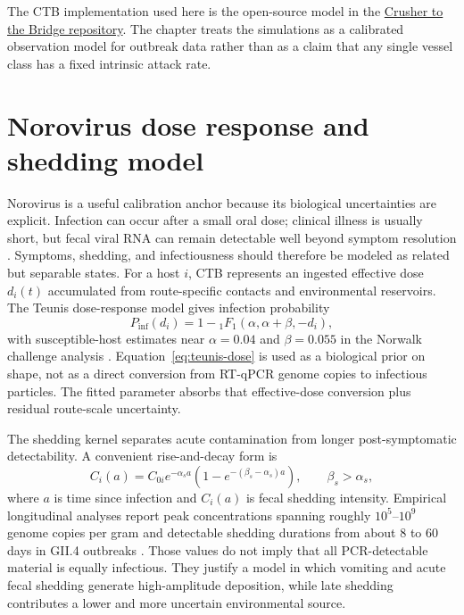 The CTB implementation used here is the open-source model in the
\href{https://github.com/bckirkup/Crusher_to_the_Bridge}{Crusher to the Bridge repository}. The chapter treats
the simulations as a calibrated observation model for outbreak data rather than as a claim that any single vessel
class has a fixed intrinsic attack rate.

\section{Norovirus dose response and shedding model}
Norovirus is a useful calibration anchor because its biological uncertainties are explicit. Infection can occur
after a small oral dose; clinical illness is usually short, but fecal viral RNA can remain detectable well beyond
symptom resolution \citep{Karst2010Pathogenesis,Teunis2014}. Symptoms, shedding, and infectiousness should
therefore be modeled as related but separable states. For a host \(i\), CTB represents an ingested effective dose
\(d_i(t)\) accumulated from route-specific contacts and environmental reservoirs. The Teunis dose-response model
gives infection probability
\begin{equation}
  P_{\mathrm{inf}}(d_i)=1-{}_1F_1\left(\alpha,\alpha+\beta,-d_i\right),
  \label{eq:teunis-dose}
\end{equation}
with susceptible-host estimates near \(\alpha=0.04\) and \(\beta=0.055\) in the Norwalk challenge analysis
\citep{Teunis2008DoseResponse}. Equation~\ref{eq:teunis-dose} is used as a biological prior on shape, not as a
direct conversion from RT-qPCR genome copies to infectious particles. The fitted \doseadj{} parameter absorbs that
effective-dose conversion plus residual route-scale uncertainty.

The shedding kernel separates acute contamination from longer post-symptomatic detectability. A convenient
rise-and-decay form is
\begin{equation}
  C_i(a)=C_{0i}e^{-\alpha_s a}\left(1-e^{-(\beta_s-\alpha_s)a}\right),
  \qquad \beta_s>\alpha_s,
  \label{eq:shedding-kernel}
\end{equation}
where \(a\) is time since infection and \(C_i(a)\) is fecal shedding intensity. Empirical longitudinal analyses
report peak concentrations spanning roughly \(10^5\)--\(10^9\) genome copies per gram and detectable shedding
durations from about 8 to 60 days in GII.4 outbreaks
\citep{Teunis2014}.
Those values do not imply that all PCR-detectable material is equally infectious. They justify a model in which
vomiting and acute fecal shedding generate high-amplitude deposition, while late shedding contributes a lower and
more uncertain environmental source.

